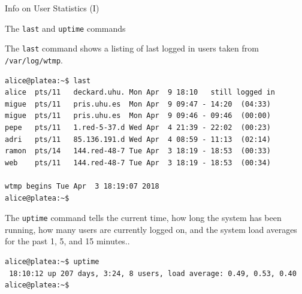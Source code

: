 \begin{frame}[t,fragile]{Info on User Statistics (I)}


  \begin{block}{The \alert{\texttt{last}} and \alert{\texttt{uptime}} commands}
    {\footnotesize
   The \alert{\texttt{last}} command shows a listing of last logged in users taken from \texttt{/var/log/wtmp}.

   {\tiny
      \begin{lstlisting}
alice@platea:~$ last
alice  pts/11   deckard.uhu. Mon Apr  9 18:10   still logged in   
migue  pts/11   pris.uhu.es  Mon Apr  9 09:47 - 14:20  (04:33)    
migue  pts/11   pris.uhu.es  Mon Apr  9 09:46 - 09:46  (00:00)    
pepe   pts/11   1.red-5-37.d Wed Apr  4 21:39 - 22:02  (00:23)    
adri   pts/11   85.136.191.d Wed Apr  4 08:59 - 11:13  (02:14)    
ramon  pts/14   144.red-48-7 Tue Apr  3 18:19 - 18:53  (00:33)    
web    pts/11   144.red-48-7 Tue Apr  3 18:19 - 18:53  (00:34)    

wtmp begins Tue Apr  3 18:19:07 2018
alice@platea:~$ 
      \end{lstlisting}
 }
   The \alert{\texttt{uptime}} command tells the current time, how long the system
      has been running, how many users are currently logged on, and
      the system load averages for the past 1, 5, and 15 minutes..


   {\tiny
      \begin{lstlisting}
alice@platea:~$ uptime
 18:10:12 up 207 days, 3:24, 8 users, load average: 0.49, 0.53, 0.40
alice@platea:~$
      \end{lstlisting}
    } 
}
  \end{block}
  
\end{frame}

